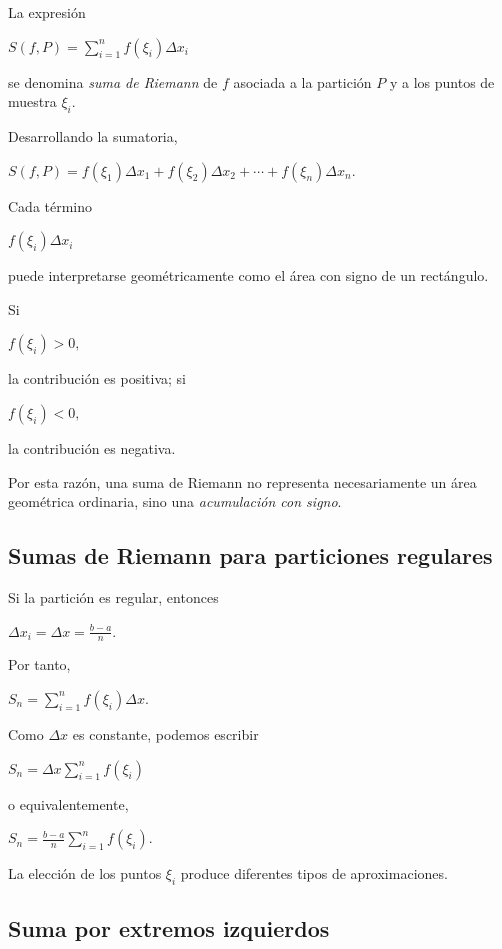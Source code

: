 \documentclass[12pt]{article}
\begin{document}
La expresión

$
\boxed{
S(f,P)
=
\sum_{i=1}^{n}
f(\xi_i)\Delta x_i
}
$

se denomina \emph{suma de Riemann} de $f$ asociada a la partición $P$
y a los puntos de muestra $\xi_i$.

Desarrollando la sumatoria,

$
S(f,P)
=
f(\xi_1)\Delta x_1
+
f(\xi_2)\Delta x_2
+
\cdots
+
f(\xi_n)\Delta x_n.
$

Cada término

$
f(\xi_i)\Delta x_i
$

puede interpretarse geométricamente como el área con signo de un
rectángulo.

Si

$
f(\xi_i)>0,
$

la contribución es positiva; si

$
f(\xi_i)<0,
$

la contribución es negativa.

Por esta razón, una suma de Riemann no representa necesariamente un área
geométrica ordinaria, sino una \emph{acumulación con signo}.

\subsection*{Sumas de Riemann para particiones regulares}

Si la partición es regular, entonces

$
\Delta x_i=\Delta x=\frac{b-a}{n}.
$

Por tanto,

$
S_n
=
\sum_{i=1}^{n}
f(\xi_i)\Delta x.
$

Como $\Delta x$ es constante, podemos escribir

$
\boxed{
S_n
=
\Delta x
\sum_{i=1}^{n}f(\xi_i)
}
$

o equivalentemente,

$
S_n
=
\frac{b-a}{n}
\sum_{i=1}^{n}f(\xi_i).
$

La elección de los puntos $\xi_i$ produce diferentes tipos de
aproximaciones.

\subsection*{Suma por extremos izquierdos}
\end{document}
